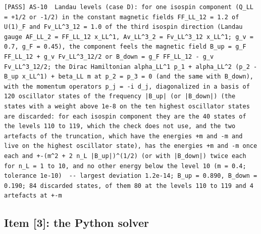\documentclass[
  10pt,
]{article}
\begin{document}
\begin{verbatim}
[PASS] AS-10  Landau levels (case D): for one isospin component (Q_LL = +1/2 or -1/2) in the constant magnetic fields FF_LL_12 = 1.2 of U(1)_F and Fv_LL^3_12 = 1.0 of the third isospin direction (Landau gauge AF_LL_2 = FF_LL_12 x_LL^1, Av_LL^3_2 = Fv_LL^3_12 x_LL^1; g_v = 0.7, g_F = 0.45), the component feels the magnetic field B_up = g_F FF_LL_12 + g_v Fv_LL^3_12/2 or B_down = g_F FF_LL_12 - g_v Fv_LL^3_12/2; the Dirac Hamiltonian alpha_LL^1 p_1 + alpha_LL^2 (p_2 - B_up x_LL^1) + beta_LL m at p_2 = p_3 = 0 (and the same with B_down), with the momentum operators p_j = -i d_j, diagonalized in a basis of 120 oscillator states of the frequency |B_up| (or |B_down|) (the states with a weight above 1e-8 on the ten highest oscillator states are discarded: for each isospin component they are the 40 states of the levels 110 to 119, which the check does not use, and the two artefacts of the truncation, which have the energies +m and -m and live on the highest oscillator state), has the energies +m and -m once each and +-(m^2 + 2 n_L |B_up|)^(1/2) (or with |B_down|) twice each for n_L = 1 to 10, and no other energy below the level 10 (m = 0.4; tolerance 1e-10)  -- largest deviation 1.2e-14; B_up = 0.890, B_down = 0.190; 84 discarded states, of them 80 at the levels 110 to 119 and 4 artefacts at +-m
\end{verbatim}

\hypertarget{item-3-the-python-solver}{%
\subsection{Item {[}3{]}: the Python
solver}\label{item-3-the-python-solver}}
\end{document}
